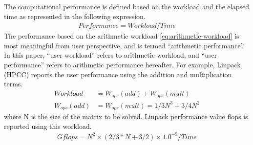 \documentclass[conference]{IEEEtran}
\begin{document}
The computational performance is defined based on the workload and
the elapsed time as represented in the following expression.
\begin{align}\label{eq:performance-workload-time}
Performance = Workload / Time 
\end{align}
%
The performance based on the arithmetic workload \eqref{eq:arithmetic-workload}
is most meaningful from user perspective,
and is termed ``arithmetic performance''.
In this paper, ``user workload'' refers to arithmetic workload,
and ``user performance'' refers to arithmetic performance hereafter.
%
For example, Linpack (HPCC) %
reports the user performance using the addition and multiplication terms.
\begin{align}
		Workload & = W_{ops}(add) + W_{ops}(mult) \\
		W_{ops}(add) & = W_{ops}(mult) = 1/3 N^{3} + 3/4 N^{2}
\end{align}
where N is the size of the matrix to be solved.
Linpack performance value flops is reported using this workload.
\begin{align}
Gflops = N^{2} \times ( 2/3 * N + 3/2 ) \times 1.0^{-9} / Time 
\end{align}
\end{document}
